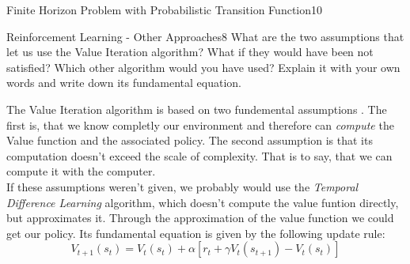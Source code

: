 \begin{questions}
\begin{question}{Finite Horizon Problem with Probabilistic Transition Function}{10}
\begin{answer}

\end{answer}

\end{question}



\begin{question}[bonus]{Reinforcement Learning - Other Approaches}{8}
What are the two assumptions that let us use the Value Iteration algorithm? What if they would have been not satisfied? Which other algorithm would you have used? Explain it with your own words and write down its fundamental equation.

\begin{answer}
	The Value Iteration algorithm is based on two fundemental assumptions . The first is, that we know completly our environment and therefore can \textit{compute} the Value function and the associated policy. The second assumption is that its computation doesn't exceed the scale of complexity. That is to say, that we can compute it with the computer.\\ 
	If these assumptions weren't given, we probably would use the \textit{Temporal Difference Learning} algorithm, which doesn't compute the value funtion directly, but approximates it. Through the approximation of the value function we could get our policy. Its fundamental equation is given by the following update rule:\\
	\begin{equation}
		V_{t+1}(s_t) = V_t(s_t) + \alpha[r_{t}+\gamma V_t(s_{t+1})-V_t(s_t)]
	\end{equation}
\end{answer}
\end{question}


\end{questions}
